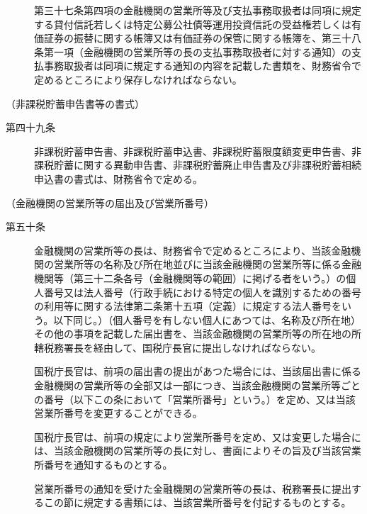 \documentclass[twocolumn,a4j,10pt]{ltjtarticle}
\begin{document}
\begin{description}
\item[]第三十七条第四項の金融機関の営業所等及び支払事務取扱者は同項に規定する貸付信託若しくは特定公募公社債等運用投資信託の受益権若しくは有価証券の振替に関する帳簿又は有価証券の保管に関する帳簿を、第三十八条第一項（金融機関の営業所等の長の支払事務取扱者に対する通知）の支払事務取扱者は同項に規定する通知の内容を記載した書類を、財務省令で定めるところにより保存しなければならない。
\end{description}
\noindent\hspace{10pt}（非課税貯蓄申告書等の書式）
\begin{description}
\item[第四十九条]非課税貯蓄申告書、非課税貯蓄申込書、非課税貯蓄限度額変更申告書、非課税貯蓄に関する異動申告書、非課税貯蓄廃止申告書及び非課税貯蓄相続申込書の書式は、財務省令で定める。
\end{description}
\noindent\hspace{10pt}（金融機関の営業所等の届出及び営業所番号）
\begin{description}
\item[第五十条]金融機関の営業所等の長は、財務省令で定めるところにより、当該金融機関の営業所等の名称及び所在地並びに当該金融機関の営業所等に係る金融機関等（第三十二条各号（金融機関等の範囲）に掲げる者をいう。）の個人番号又は法人番号（行政手続における特定の個人を識別するための番号の利用等に関する法律第二条第十五項（定義）に規定する法人番号をいう。以下同じ。）（個人番号を有しない個人にあつては、名称及び所在地）その他の事項を記載した届出書を、当該金融機関の営業所等の所在地の所轄税務署長を経由して、国税庁長官に提出しなければならない。
\item[]国税庁長官は、前項の届出書の提出があつた場合には、当該届出書に係る金融機関の営業所等の全部又は一部につき、当該金融機関の営業所等ごとの番号（以下この条において「営業所番号」という。）を定め、又は当該営業所番号を変更することができる。
\item[]国税庁長官は、前項の規定により営業所番号を定め、又は変更した場合には、当該金融機関の営業所等の長に対し、書面によりその旨及び当該営業所番号を通知するものとする。
\item[]営業所番号の通知を受けた金融機関の営業所等の長は、税務署長に提出するこの節に規定する書類には、当該営業所番号を付記するものとする。
\end{description}
\end{document}
